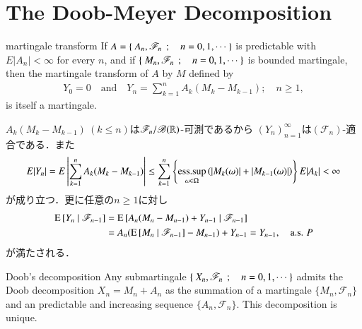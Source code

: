 \section{The Doob-Meyer Decomposition}
	\begin{itembox}[l]{martingale transform}
		If $A = \left\{\ A_n,\mathscr{F}_n\ \, ; \quad n=0,1,\cdots\ \right\}$ is predictable with $E|A_n|<\infty$ for every $n$,
		and if $\left\{\ M_n,\mathscr{F}_n\ \, ; \quad n=0,1,\cdots\ \right\}$ is bounded martingale, then the martingale transform of $A$
		by $M$ defined by
		\begin{align}
			Y_0 = 0 \quad \mbox{and} \quad
			Y_n = \sum_{k=1}^n A_k (M_k - M_{k-1});
			\quad n \geq 1, 
		\end{align}
		is itself a martingale.
	\end{itembox}
	
	\begin{prf}
		$A_k(M_k - M_{k-1})\ (k \leq n)$は$\mathscr{F}_n/\mathscr{B}(\mathbb{R})$-可測であるから
		$(Y_n)_{n=1}^\infty$は$(\mathscr{F}_n)$-適合である．また
		\begin{align}
			E|Y_n| = E\left| \sum_{k=1}^n A_k (M_k - M_{k-1}) \right|
			\leq \sum_{k=1}^n \left\{\operatorname*{ess\mbox{.}sup}_{\omega \in \Omega} \left(|M_k(\omega)|+|M_{k-1}(\omega)|\right)\right\} E|A_k| < \infty
		\end{align}
		が成り立つ．更に任意の$n \geq 1$に対し
		\begin{align}
			\operatorname{E} \left[ Y_n \ \middle|\ \mathscr{F}_{n-1} \right]
			&= \operatorname{E} \left[ A_n(M_n - M_{n-1}) + Y_{n-1} \ \middle|\ \mathscr{F}_{n-1} \right] \\
			&= A_n(\operatorname{E} \left[ M_n \ \middle|\ \mathscr{F}_{n-1} \right] - M_{n-1}) + Y_{n-1}
			= Y_{n-1},
			\quad \mbox{a.s. $P$}
		\end{align}
		が満たされる．
		\QED
	\end{prf}
	
	\begin{itembox}[l]{Doob's decomposition}
		Any submartingale $\left\{\ X_n,\mathscr{F}_n\ \, ; \quad n=0,1,\cdots\ \right\}$ admits the Doob decomposition
		$X_n = M_n + A_n$ as the summation of a martingale $\{M_n,\mathscr{F}_n\}$ and an 
		predictable and increasing sequence $\{A_n,\mathscr{F}_n\}$.
		This decomposition is unique.
	\end{itembox}
	
